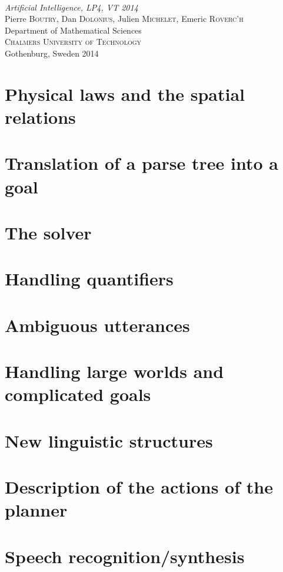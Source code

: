 \documentclass[a4wide]{article}
\begin{document}
\begin{titlepage}
\begin{flushleft}
	{ \\[0.5cm]
	\emph{\Large Artificial Intelligence, LP4, VT 2014} \\[.8cm]
	
	{\Large Pierre \textsc{Boutry}, Dan \textsc{Dolonius}, Julien \textsc{Michelet}, Emeric \textsc{Roverc’h}}\\[.8cm]
	
	{\large Department of Mathematical Sciences \\
	\textsc{Chalmers University of Technology} \\
	Gothenburg, Sweden 2014 \\
	} 
	}
\end{flushleft}

\end{titlepage}

\section{Physical laws and the spatial relations}


\section{Translation of a parse tree into a goal}


\section{The solver}


\section{Handling quantifiers}


\section{Ambiguous utterances}


\section{Handling large worlds and complicated goals}


\section{New linguistic structures}


\section{Description of the actions of the planner}


\section{Speech recognition/synthesis}

\end{document}
